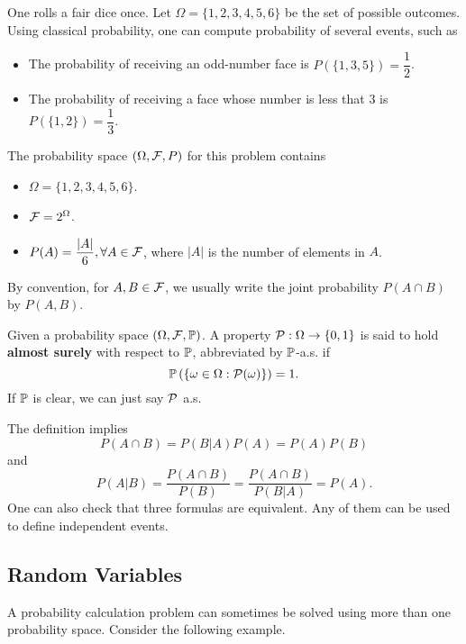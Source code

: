 \begin{example}
  One rolls a fair dice once. Let $\Omega=\{1,2,3,4,5,6\}$ be the set of possible outcomes. Using classical probability, one can compute probability of several events, such as
  \begin{itemize}
    \item The probability of receiving an odd-number face is $P(\{1,3,5\})=\dfrac{1}{2}$.
    \item The probability of receiving a face whose number is less that $3$ is $P(\{1,2\})=\dfrac{1}{3}$.
  \end{itemize}
  The probability space $(\Omega, \F, P)$ for this problem contains
  \begin{itemize}
    \item $\Omega=\{1,2,3,4,5,6\}$.
    \item $\F=2^\Omega$.
    \item $P(A)=\dfrac{|A|}{6},\forall A\in\F$, where $|A|$ is the number of elements in $A$.
  \end{itemize}
\end{example}

\begin{remark}
  By convention, for $A,B\in\F$, we usually write the joint probability
  $P(A\cap B)$ by $P(A,B)$.
\end{remark}

\begin{definition}
  \label{definition:property-almost-surely}
  Given a probability space $(\Omega, \F, \PP)$. A property $\P:\Omega\to\{0,1\}$ is said to hold \textbf{almost surely} with respect to $\PP$, abbreviated by $\PP$-a.s. if
  \begin{equation}
    \PP\left(\left\{\omega\in\Omega : \P(\omega)\right\}\right) = 1.
  \end{equation}
  If $\PP$ is clear, we can just say $\P$ a.s.
\end{definition}

\begin{remark}
  The definition implies
  $$P(A\cap B)=P(B|A)P(A)=P(A)P(B)$$
  and
  $$P(A|B)=\dfrac{P(A\cap B)}{P(B)}=\dfrac{P(A\cap B)}{P(B|A)}=P(A).$$
  One can also check that three formulas are equivalent. Any of them can be used to define independent events.
\end{remark}

\subsection{Random Variables}
A probability calculation problem can sometimes be solved using more than one probability space. Consider the following example.

